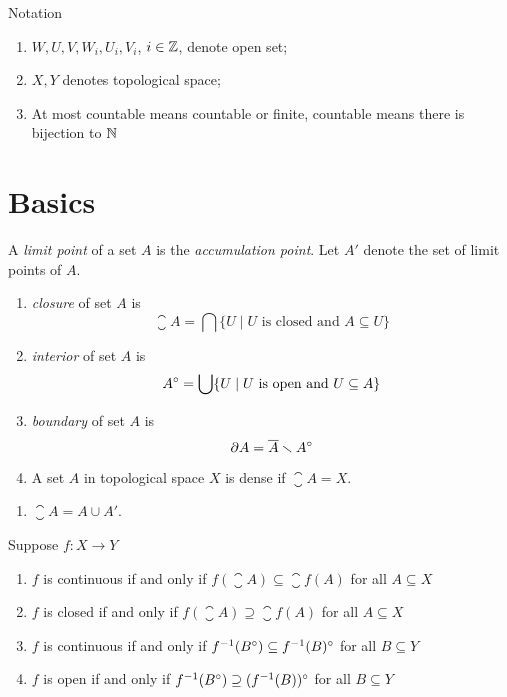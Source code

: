 \documentclass[twocolumn]{article}
\begin{document}
\begin{fdefi}{Notation}{}
	\begin{enumerate}
		\item $W, U, V, W_i, U_i, V_i$, $i \in \mathbb{Z}$, denote open set;
		\item $X, Y$ denotes topological space;
		\item At most countable means countable or finite, countable means there is bijection to $\mathbb{N}$
	\end{enumerate}
\end{fdefi}
\hrulefill

\section{Basics}

\begin{defi}
	A \emph{limit point} of a set $A$ is the \emph{accumulation point}.
	Let $A'$ denote the set of limit points of $A$.
\end{defi}

\begin{defi}
	\begin{enumerate}
		\item \emph{closure} of set $A$ is 
			$$
				\closure{A} = \bigcap \{ U \mid U \text{ is closed and } A \subseteq U \}
			$$
		\item \emph{interior} of set $A$ is 
			$$
				A^{\circ} = \bigcup \{ U \mid U \text{ is open and } U \subseteq A \}
			$$
		\item \emph{boundary} of set $A$ is 
			$$
			\partial A = \overline{A} \smallsetminus A^{\circ} 
			$$
		\item A set $A$ in topological space $X$ is dense if $\closure{A} = X$.
	\end{enumerate}
\end{defi}

\begin{thm}
	\begin{enumerate}
		\item $\closure{A} = A \cup A'$.
	\end{enumerate}
\end{thm}

\begin{thm}
	Suppose $f : X \rightarrow Y$
	\begin{enumerate}
		\item $f$ is continuous if and only if $f(\closure{A}) \subseteq \closure{f(A)}$  for all $A \subseteq X$
		\item $f$ is closed if and only if $f(\closure{A}) \supseteq  \closure{f(A)}  $ for all $A \subseteq X$
		\item $f$ is continuous if and only if $f^{-1}(B^{\circ}) \subseteq f^{-1}(B)^{\circ}$ for all $B \subseteq Y$ 
		\item $f$ is open if and only if $f^{-1}(B^{\circ}) \supseteq (f^{-1}(B))^{\circ}$ for all $B \subseteq Y$
	\end{enumerate}
\end{thm}
\end{document}

